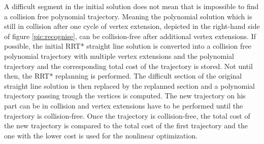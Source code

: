 A difficult segment in the initial solution does not mean that is impossible to find a collision free polynomial trajectory. Meaning the polynomial solution which is still in collision after one cycle of vertex extension, depicted in the right-hand side of figure \ref{pic:recognise}, can be collision-free after additional vertex extensions. If possible, the initial RRT* straight line solution is converted into a collision free polynomial trajectory with multiple vertex extensions and the polynomial trajectory and the corresponding total cost of the trajectory is stored. \newline
Not until then, the RRT* replanning is performed. The difficult section of the original straight line solution is then replaced by the replanned section and a polynomial trajectory passing trough the vertices is computed. The new trajectory on his part can be in collision and vertex extensions have to be performed until the trajectory is collision-free. Once the trajectory is collision-free, the total cost of the new trajectory is compared to the total cost of the first trajectory and the one with the lower cost is used for the nonlinear optimization.



%
%
%
%
%
%
%
%
%

